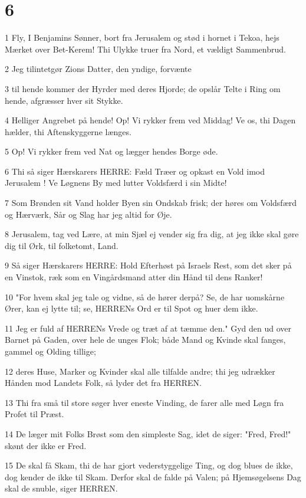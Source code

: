 \chapter{6}

\par 1 Fly, I Benjamins Sønner, bort fra Jerusalem og stød i hornet i Tekoa, hejs Mærket over Bet-Kerem! Thi Ulykke truer fra Nord, et vældigt Sammenbrud.
\par 2 Jeg tilintetgør Zions Datter, den yndige, forvænte
\par 3 til hende kommer der Hyrder med deres Hjorde; de opslår Telte i Ring om hende, afgræsser hver sit Stykke.
\par 4 Helliger Angrebet på hende! Op! Vi rykker frem ved Middag! Ve os, thi Dagen hælder, thi Aftenskyggerne længes.
\par 5 Op! Vi rykker frem ved Nat og lægger hendes Borge øde.
\par 6 Thi så siger Hærskarers HERRE: Fæld Træer og opkast en Vold imod Jerusalem ! Ve Løgnens By med lutter Voldsfærd i sin Midte!
\par 7 Som Brønden sit Vand holder Byen sin Ondskab frisk; der høres om Voldsfærd og Hærværk, Sår og Slag har jeg altid for Øje.
\par 8 Jerusalem, tag ved Lære, at min Sjæl ej vender sig fra dig, at jeg ikke skal gøre dig til Ørk, til folketomt, Land.
\par 9 Så siger Hærskarers HERRE: Hold Efterhøst på Israels Rest, som det sker på en Vinstok, ræk som en Vingårdsmand atter din Hånd til dens Ranker!
\par 10 "For hvem skal jeg tale og vidne, så de hører derpå? Se, de har uomskårne Ører, kan ej lytte til; se, HERRENs Ord er til Spot og huer dem ikke.
\par 11 Jeg er fuld af HERRENs Vrede og træt af at tæmme den." Gyd den ud over Barnet på Gaden, over hele de unges Flok; både Mand og Kvinde skal fanges, gammel og Olding tillige;
\par 12 deres Huse, Marker og Kvinder skal alle tilfalde andre; thi jeg udrækker Hånden mod Landets Folk, så lyder det fra HERREN.
\par 13 Thi fra små til store søger hver eneste Vinding, de farer alle med Løgn fra Profet til Præst.
\par 14 De læger mit Folks Brøst som den simpleste Sag, idet de siger: "Fred, Fred!" skønt der ikke er Fred.
\par 15 De skal få Skam, thi de har gjort vederstyggelige Ting, og dog blues de ikke, dog kender de ikke til Skam. Derfor skal de falde på Valen; på Hjemsøgelsens Dag skal de snuble, siger HERREN.
